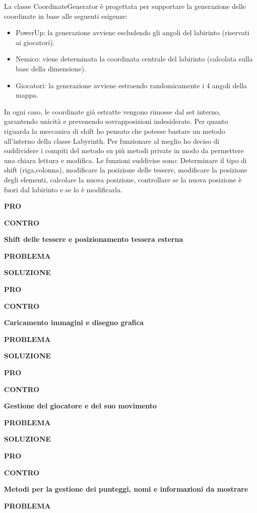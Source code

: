 \documentclass[a4paper,12pt]{report}
\begin{document}
La classe CoordinateGenerator è progettata per supportare la generazione delle coordinate in base alle seguenti esigenze:
\begin{itemize}
	\item PowerUp: la generazione avviene escludendo gli angoli del labirinto (riservati ai giocatori).
	\item Nemico: viene determinata la coordinata centrale del labirinto (calcolata sulla base della dimensione).
	\item Giocatori: la generazione avviene estraendo randomicamente i 4 angoli della mappa.
\end{itemize}
In ogni caso, le coordinate già estratte vengono rimosse dal set interno, garantendo unicità e prevenendo sovrapposizioni indesiderate.
Per quanto riguarda la meccanica di shift ho pensato che potesse bastare un metodo all'interno della classe Labyrinth.
Per funzionare al meglio ho deciso di suddividere i compiti del metodo su più metodi private in modo da permettere una chiara lettura e modifica.
Le funzioni suddivise sono: Determinare il tipo di shift (riga,colonna), modificare la posizione delle tessere, modificare la posizione degli elementi, calcolare la nuova posizione,
controllare se la nuova posizione è fuori dal labirinto e se lo è modificarla.

\textbf{PRO}


\textbf{CONTRO}

\textbf{Shift delle tessere e posizionamento tessera esterna}

\textbf{PROBLEMA}

\textbf{SOLUZIONE}

\textbf{PRO}

\textbf{CONTRO}

\textbf{Caricamento immagini e disegno grafica}

\textbf{PROBLEMA}

\textbf{SOLUZIONE}

\textbf{PRO}

\textbf{CONTRO}

\textbf{Gestione del giocatore e del suo movimento}

\textbf{PROBLEMA}

\textbf{SOLUZIONE}

\textbf{PRO}

\textbf{CONTRO}

\textbf{Metodi per la gestione dei punteggi, nomi e informazioni da mostrare}

\textbf{PROBLEMA}
\end{document}
